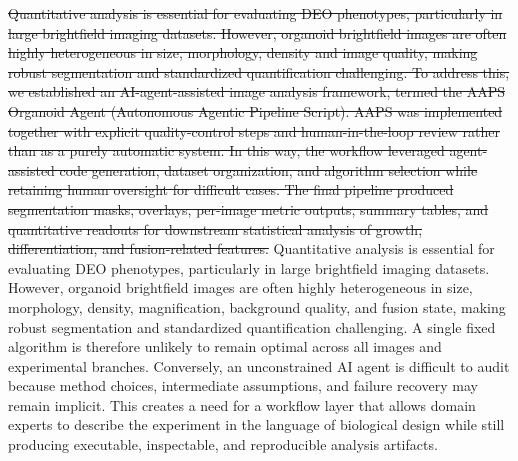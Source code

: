 \documentclass[
]{article}
\providecommand{\DIFadd}[1]{{\begingroup\color{blue}#1\endgroup}}
\providecommand{\DIFdel}[1]{{\begingroup\color{red}\sout{#1}\endgroup}}
\begin{document}
\DIFdel{Quantitative analysis is essential for evaluating DEO phenotypes, particularly in large brightfield imaging datasets. However, organoid brightfield images are often highly heterogeneous in size, morphology, density and image quality, making robust segmentation and standardized quantification challenging. To address this, we established an AI-agent-assisted image analysis framework, termed the AAPS Organoid Agent (Autonomous Agentic Pipeline Script). AAPS was implemented together with explicit quality-control steps and human-in-the-loop review rather than as a purely automatic system. In this way, the workflow leveraged agent-assisted code generation, dataset organization, and algorithm selection while retaining human oversight for difficult cases. The final pipeline produced segmentation masks, overlays, per-image metric outputs, summary tables, and quantitative readouts for downstream statistical analysis of growth, differentiation, and fusion-related features.}
\DIFadd{Quantitative analysis is essential for evaluating DEO phenotypes, particularly in large brightfield imaging datasets. However, organoid brightfield images are often highly heterogeneous in size, morphology, density, magnification, background quality, and fusion state, making robust segmentation and standardized quantification challenging. A single fixed algorithm is therefore unlikely to remain optimal across all images and experimental branches. Conversely, an unconstrained AI agent is difficult to audit because method choices, intermediate assumptions, and failure recovery may remain implicit. This creates a need for a workflow layer that allows domain experts to describe the experiment in the language of biological design while still producing executable, inspectable, and reproducible analysis artifacts.}
\end{document}
